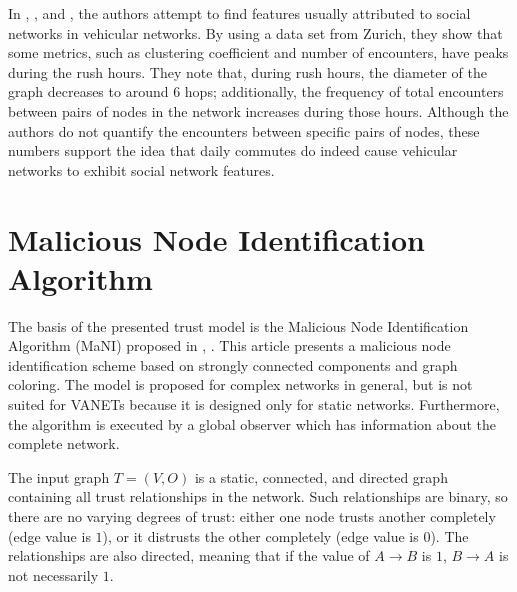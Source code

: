 In \cite{da2013effective}, \cite{cunha2014vehicular}, and \cite{cunha2014possible}, the authors attempt to find features usually attributed to social networks in vehicular networks.
By using a data set from Zurich, they show that some metrics, such as clustering coefficient and number of encounters, have peaks during the rush hours.
They note that, during rush hours, the diameter of the graph decreases to around 6 hops; additionally, the frequency of total encounters between pairs of nodes in the network increases during those hours.
Although the authors do not quantify the encounters between specific pairs of nodes, these numbers support the idea that daily commutes do indeed cause vehicular networks to exhibit social network features.


\section{Malicious Node Identification Algorithm}

The basis of the presented trust model is the Malicious Node Identification Algorithm (MaNI) proposed in \cite{vernize2015malicious}, \cite{vernize2013dissertation}.
This article presents a malicious node identification scheme based on strongly connected components and graph coloring.
The model is proposed for complex networks in general, but is not suited for VANETs because it is designed only for static networks.
Furthermore, the algorithm is executed by a global observer which has information about the complete network.

The input graph $T = (V,O)$ is a static, connected, and directed graph containing all trust relationships in the network.
Such relationships are binary, so there are no varying degrees of trust: either one node trusts another completely (edge value is $1$), or it distrusts the other completely (edge value is $0$).
The relationships are also directed, meaning that if the value of $A\rightarrow B$ is $1$, $B\rightarrow A$ is not necessarily $1$.


